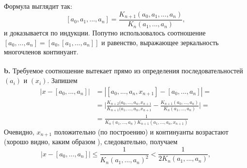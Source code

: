 \noindent Формула выглядит так:
$$[a_0,a_1,...,a_n]=\frac{K_{n+1}(a_0,a_1,...,a_n)}{K_n(a_1,...,a_n)},$$
и доказывается по индукции. Попутно использовалось соотношение\linebreak
$[a_0,...,a_n]=[a_0,[a_1,...,a_n]]$ и равенство, выражающее зеркальность\linebreak
многочленов континуант.\\
\\
\hspace*{15pt}\textbf{b.} Требуемое соотношение вытекает прямо из определения \linebreak
последовательностей $(a_i)$ и $(x_i)$. Запишем
\begin{equation}
	\begin{split}
		|x-[a_0,...,a_n]|&=|[a_0,...,a_n,x_{n+1}]-[a_0,...,a_n]|=\\
		&=\bigg|\frac{ K_{n+2}(a_0,...,a_n,x_{n+1} }{ K_{n+1}(a_1,...,a_n,x_{n+1} }
		-\frac{ K_{n+1}(a_0,...,a_n) }{K_n(a_1,...,a_n)} \bigg|= \\
		&=\frac{1}{ K_n(a_1,...,a_n)K_{n+1}(a_1,...,a_n,x_{n+1}) }
	\end{split}
\end{equation}
Очевидно, $x_{n+1}$ положительно (по построению) и континуанты возра­стают\linebreak
(хорошо видно, каким образом ), следовательно, получаем
\begin{equation}
	\big|x-[a_0,...,a_n]\big|\leqslant \frac{1}{K_n(a_1,...,a_n)^2}<\frac{1}{2K_n(a_1,...,a_n)},
\end{equation}

